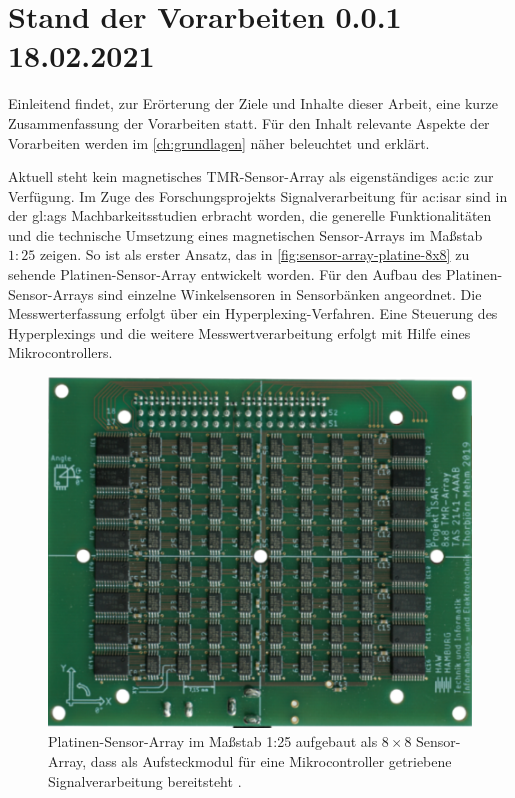 %

\section{Stand der Vorarbeiten 0.0.1 18.02.2021}\label{sec:stand-der-vorarbeiten}

Einleitend findet, zur Erörterung der Ziele und Inhalte dieser Arbeit, eine kurze Zusammenfassung der Vorarbeiten statt. Für den Inhalt relevante Aspekte der Vorarbeiten werden im \autoref{ch:grundlagen} näher beleuchtet und erklärt.


Aktuell steht kein magnetisches TMR-Sensor-Array als eigenständiges \gls{ac:ic} zur Verfügung. Im Zuge des Forschungsprojekts Signalverarbeitung für \gls{ac:isar} sind in der \gls{gl:ags} Machbarkeitsstudien \cite{Mehm2019}\cite{Ernsting2020} erbracht worden, die generelle Funktionalitäten und die technische Umsetzung eines magnetischen Sensor-Arrays im Maßstab $1:25$ zeigen.
\newline
So ist als erster Ansatz, das in \autoref{fig:sensor-array-platine-8x8} zu sehende Platinen-Sensor-Array entwickelt worden. Für den Aufbau des Platinen-Sensor-Arrays sind einzelne Winkelsensoren in Sensorbänken angeordnet. Die Messwerterfassung erfolgt über ein Hyperplexing-Verfahren.
Eine Steuerung des Hyperplexings und die weitere Messwertverarbeitung erfolgt mit Hilfe eines Mikrocontrollers.

\begin{figure}[tbph]
	\centering
	\includegraphics[width=0.7\linewidth]{chapters/images/Sensor-Array-Platine-8x8}
	\caption[Platinen-Sensor-Array Maßstab 1:25]{Platinen-Sensor-Array im Maßstab 1:25 aufgebaut als $8\times8$ Sensor-Array,
		dass als Aufsteckmodul für eine Mikrocontroller getriebene Signalverarbeitung bereitsteht \cite{Mehm2019}.}
	\label{fig:sensor-array-platine-8x8}
\end{figure}

